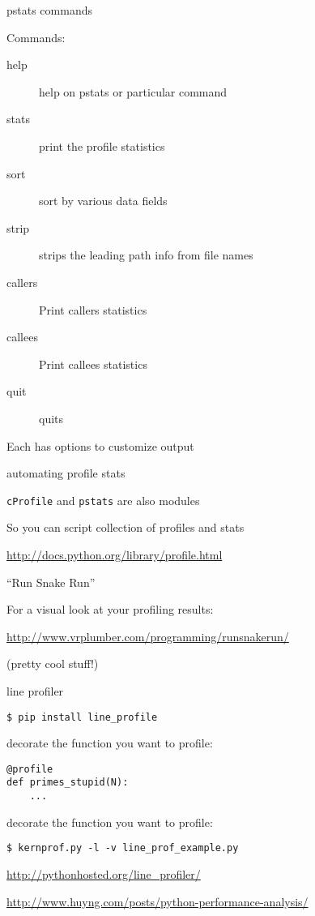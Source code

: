 \documentclass{beamer}
\begin{document}
\begin{frame}[fragile]{pstats commands}

{\Large Commands:}

\begin{description}
  \item[help] help on pstats or particular command
  \item[stats] print the profile statistics
  \item[sort] sort by various data fields
  \item[strip] strips the leading path info from file names
  \item[callers] Print callers statistics
  \item[callees] Print callees statistics
  \item[quit] quits
\end{description}
{\large Each has options to customize output}

\end{frame} 

\begin{frame}[fragile]{automating profile stats}

{\Large \verb|cProfile| and \verb|pstats| are also modules}

\vfill
{\Large So you can script collection of profiles and stats}

\vfill
\url{http://docs.python.org/library/profile.html}

\end{frame} 

\begin{frame}[fragile]{``Run Snake Run''}

\vfill
{\Large For a visual look at your profiling results:}

\vfill
\url{http://www.vrplumber.com/programming/runsnakerun/}

\vfill
(pretty cool stuff!)

\end{frame} 

\begin{frame}[fragile]{line profiler}

\vfill
{\large \verb|$ pip install line_profile|}

\vfill
{\large decorate the function you want to profile:}

\begin{verbatim}
@profile
def primes_stupid(N):
    ...
\end{verbatim}

\vfill
{\large decorate the function you want to profile:}

{\large \verb|$ kernprof.py -l -v line_prof_example.py|}


\vfill
\url{http://pythonhosted.org/line_profiler/}

\vfill
\url{http://www.huyng.com/posts/python-performance-analysis/}

\end{frame}
\end{document}
